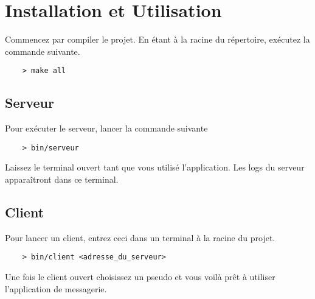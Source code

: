 
\section{Installation et Utilisation}
Commencez par compiler le projet. En étant à la racine du répertoire, exécutez la commande suivante.
\begin{verbatim}
    > make all
\end{verbatim}
\subsection{Serveur}
Pour exécuter le serveur, lancer la commande suivante
\begin{verbatim}
    > bin/serveur
\end{verbatim}

Laissez le terminal ouvert tant que vous utilisé l'application. Les logs du serveur apparaîtront dans ce terminal.

\subsection{Client}

Pour lancer un client, entrez ceci dans un terminal à la racine du projet.

\begin{verbatim}
    > bin/client <adresse_du_serveur>
\end{verbatim}

Une fois le client ouvert choisissez un pseudo et vous voilà prêt à utiliser l'application de messagerie.